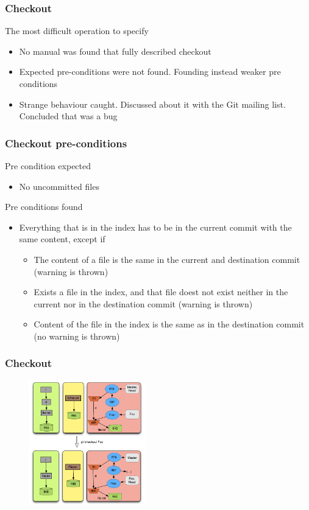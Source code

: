 \documentclass{beamer}
\begin{document}
\begin{frame}[fragile]
	\frametitle{Checkout}
	\begin{block}{The most difficult operation to specify}
	\begin{itemize}
		\item No manual was found that 
		fully described checkout
		\item Expected pre-conditions were not found. Founding instead
		weaker pre conditions
		\item Strange behaviour caught. Discussed about it 
		with the Git mailing list. Concluded that was a bug
	\end{itemize}
	\end{block}
\end{frame}

\begin{frame}
	\frametitle{Checkout pre-conditions}
	\begin{block}{Pre condition expected}
	\begin{itemize}
		\item No uncommitted files
	\end{itemize}
	\end{block}
	\begin{block}{Pre conditions found}
	\begin{itemize}
		\item Everything that is in the index has to be
		in the current commit with the same content, except if
		\begin{itemize}
		\item The content of a file is the same in the current
		and destination commit (warning is thrown)
		\item Exists a file in the index, and that file doest not
		exist neither in the current nor in the destination commit
		(warning is thrown)
		\item Content of the file in the index is the same as in the
		destination commit (no warning is thrown)
		\end{itemize}
	\end{itemize}
	\end{block}
\end{frame}
\begin{frame}[fragile]
   \frametitle{Checkout}
   \begin{figure}
      \centering
      \includegraphics[width=0.45\textwidth]{images/checkout.png}
   \end{figure}
\end{frame}
\end{document}
